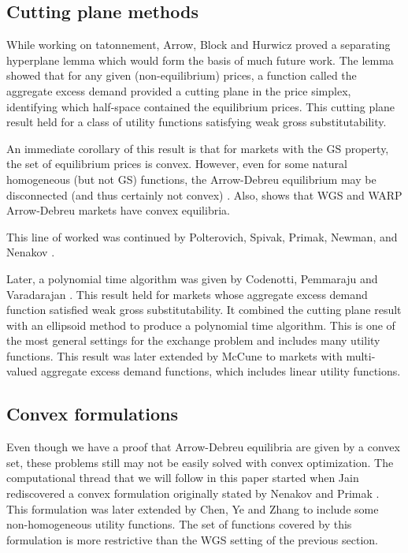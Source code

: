\documentclass{article}
\begin{document}
\subsection{Cutting plane methods}
While working on tatonnement, Arrow, Block and Hurwicz \cite{arrow1959stability} proved a separating hyperplane lemma which would form the basis of much future work. The lemma showed that for any given (non-equilibrium) prices, a function called the aggregate excess demand provided a cutting plane in the price simplex, identifying which half-space contained the equilibrium prices.
This cutting plane result held for a class of utility functions satisfying weak gross substitutability.

An immediate corollary of this result is that for markets with the GS property, the set of equilibrium prices is convex.  
However, even for some natural homogeneous (but not GS) functions, the Arrow-Debreu equilibrium may be disconnected (and thus certainly not convex) \cite{gjerstad1996multiple}. Also, \cite[p.~608]{mas1995microeconomic} shows that WGS and WARP Arrow-Debreu markets have convex equilibria.

This line of worked was continued by Polterovich, Spivak, Primak, Newman, and Nenakov \cite{nenakov1983algorithm,newman1992complexity,primak1984algorithm,primak1993converging}.

Later, a polynomial time algorithm was given by Codenotti, Pemmaraju and Varadarajan \cite{codenotti2005polynomial}. This result held for markets whose aggregate excess demand function satisfied weak gross substitutability. It combined the cutting plane result with an ellipsoid method to produce a polynomial time algorithm. This is one of the most general settings for the exchange problem and includes many utility functions. This result was later extended by McCune \cite{mccune2007extending} to markets with multi-valued aggregate excess demand functions, which includes linear utility functions.

\subsection{Convex formulations}
Even though we have a proof that Arrow-Debreu equilibria are given by a convex set, these problems still may not be easily solved with convex optimization.
The computational thread that we will follow in this paper started when Jain \cite{jain2007polynomial} rediscovered a convex formulation originally stated by Nenakov and Primak \cite{nenakov1983algorithm}. This formulation was later extended by Chen, Ye and Zhang \cite{chen2007note,chen2010equilibrium} to include some non-homogeneous utility functions. The set of functions covered by this formulation is more restrictive than the WGS setting of the previous section. 
\end{document}
